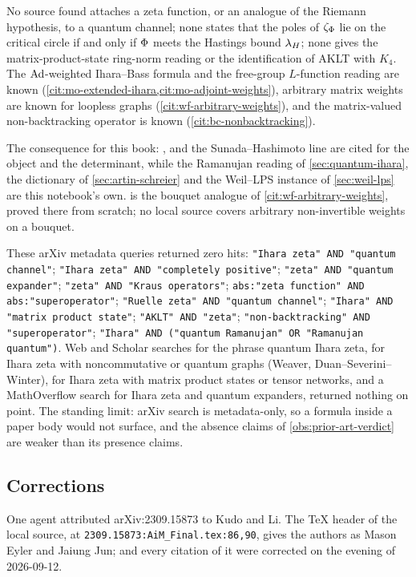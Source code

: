 \begin{observation}
\label{obs:prior-art-verdict}
No source found attaches a zeta function, or an analogue of the Riemann
hypothesis, to a quantum channel; none states that the poles of $\zeta_{\Phi}$ lie
on the critical circle if and only if $\Phi$ meets the Hastings bound
$\lambda_H$; none gives the matrix-product-state ring-norm reading or the
identification of AKLT with $K_4$. The $\operatorname{Ad}$-weighted Ihara--Bass formula and
the free-group $L$-function reading are known
(\cref{cit:mo-extended-ihara,cit:mo-adjoint-weights}), arbitrary matrix
weights are known for loopless graphs (\cref{cit:wf-arbitrary-weights}), and
the matrix-valued non-backtracking operator is known
(\cref{cit:bc-nonbacktracking}).
\end{observation}

The consequence for this book: \cite{matsuura2022km}, \cite{watanabe2011zeta}
and the Sunada--Hashimoto line are cited for the object and the determinant,
while the Ramanujan reading of \cref{sec:quantum-ihara}, the dictionary of
\cref{sec:artin-schreier} and the Weil--LPS instance of \cref{sec:weil-lps}
are this notebook's own.  is the bouquet analogue of
\cref{cit:wf-arbitrary-weights}, proved there from scratch; no local source
covers arbitrary non-invertible weights on a bouquet.

\begin{sloppypar}\small These arXiv metadata queries returned zero hits:
\texttt{"Ihara zeta" AND "quantum channel"}; \texttt{"Ihara zeta" AND
"completely positive"}; \texttt{"zeta" AND "quantum expander"};
\texttt{"zeta" AND "Kraus operators"}; \texttt{abs:"zeta function" AND
abs:"superoperator"}; \texttt{"Ruelle zeta" AND "quantum channel"};
\texttt{"Ihara" AND "matrix product state"}; \texttt{"AKLT" AND "zeta"};
\texttt{"non-backtracking" AND "superoperator"}; \texttt{"Ihara" AND
("quantum Ramanujan" OR "Ramanujan quantum")}.
Web and Scholar searches for the phrase quantum Ihara zeta, for Ihara zeta
with noncommutative or quantum graphs (Weaver, Duan--Severini--Winter), for
Ihara zeta with matrix product states or tensor networks, and a MathOverflow
search for Ihara zeta and quantum expanders, returned nothing on point. The
standing limit: arXiv search is metadata-only, so a formula inside a paper
body would not surface, and the absence claims of
\cref{obs:prior-art-verdict} are weaker than its presence claims.\end{sloppypar}

\subsection{Corrections}

One agent attributed arXiv:2309.15873 to Kudo and Li. The \TeX{} header of
the local source, at \texttt{2309.15873:AiM\_Final.tex:86,90}, gives the
authors as Mason Eyler and Jaiung Jun; \cite{eyler2023artin} and every
citation of it were corrected on the evening of 2026-09-12.
